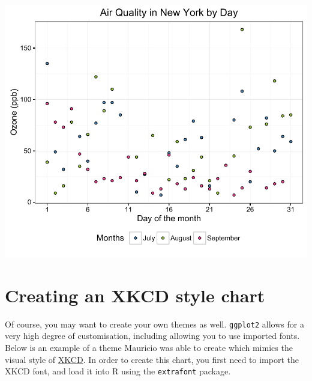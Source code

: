 \begin{center}\includegraphics[width=0.6\linewidth]{5_Scatter_Plots_pdf/scatter_12-1} \end{center}

\section{Creating an XKCD style
chart}\label{creating-an-xkcd-style-chart}

Of course, you may want to create your own themes as well.
\texttt{ggplot2} allows for a very high degree of customisation,
including allowing you to use imported fonts. Below is an example of a
theme Mauricio was able to create which mimics the visual style of
\href{http://xkcd.com/}{XKCD}. In order to create this chart, you first
need to import the XKCD font, and load it into R using the
\texttt{extrafont} package.

